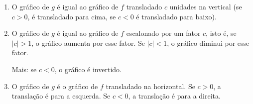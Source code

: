 \begin{enumerate}
	\item O gráfico de $g$ é igual ao gráfico de $f$ transladado $c$ unidades na 
vertical (se $c>0$, é transladado para cima, se $c<0$ é transladado para baixo).
	\item O gráfico de $g$ é igual ao gráfico de $f$ escalonado por um fator $c$,
	isto é, se $|c|>1$, o gráfico aumenta por esse fator.
	Se $|c|<1$, o gráfico diminui por esse fator.
	
	Mais: se $c<0$, o gráfico é invertido.
	\item O gráfico de $g$ é o gráfico de $f$ transladado na horizontal.
	Se $c>0$, a translação é para a esquerda.
	Se $c<0$, a translação é para a direita.
\end{enumerate}
